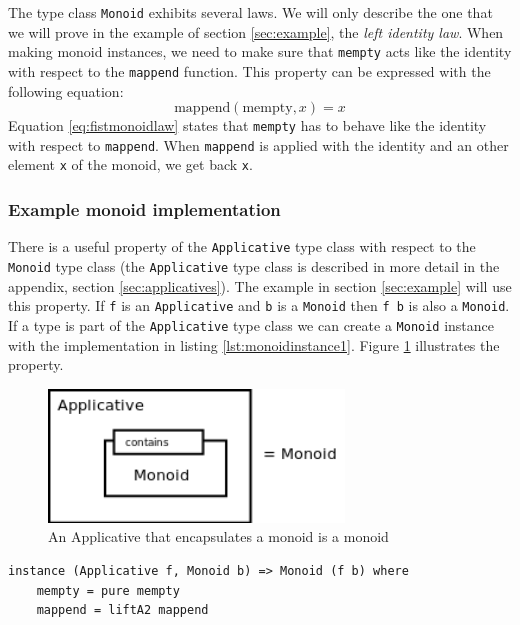 The type class \verb|Monoid| exhibits several laws. We will only describe the one that we will prove in the example of section \ref{sec:example}, the \emph{left identity law}.
When making monoid instances, we need to make sure that \verb|mempty| acts like the identity with respect to the \verb|mappend| function. This property can be expressed with the following equation:
\begin{equation}
  \label{eq:firstmonoidlaw}
  \text{mappend}(\text{mempty}, x) = x
\end{equation}
Equation \ref{eq:fistmonoidlaw} states that \verb|mempty| has to behave like the identity with respect to \verb|mappend|. When \verb|mappend| is applied with the identity and an other element \verb|x| of the monoid, we get back \verb|x|.

\subsubsection{Example monoid implementation}

There is a useful property of the \verb|Applicative| type class with respect to the \verb|Monoid| type class (the \verb|Applicative| type class is described in more detail in the appendix, section \ref{sec:applicatives}). The example in section \ref{sec:example} will use this property. If \verb|f| is an \verb|Applicative| and \verb|b| is a \verb|Monoid| then \verb|f b| is also a \verb|Monoid|. If a type is part of the \verb|Applicative| type class we can create a \verb|Monoid| instance with the implementation in listing \ref{lst:monoidinstance1}. Figure \ref{fig:applicative_monoid} illustrates the property.

\begin{figure}
  \centering
     \includegraphics[width=0.7\textwidth]{monoid}
  \caption{An Applicative that encapsulates a monoid is a monoid}
  \label{fig:applicative_monoid}
\end{figure}

\lstset{
basicstyle=\ttfamily,
columns=fullflexible,
keepspaces=true,
}
\begin{lstlisting}[caption={Monoid instance implementation of applicatives},label={lst:monoidinstance1}]
instance (Applicative f, Monoid b) => Monoid (f b) where
    mempty = pure mempty
    mappend = liftA2 mappend
\end{lstlisting}

